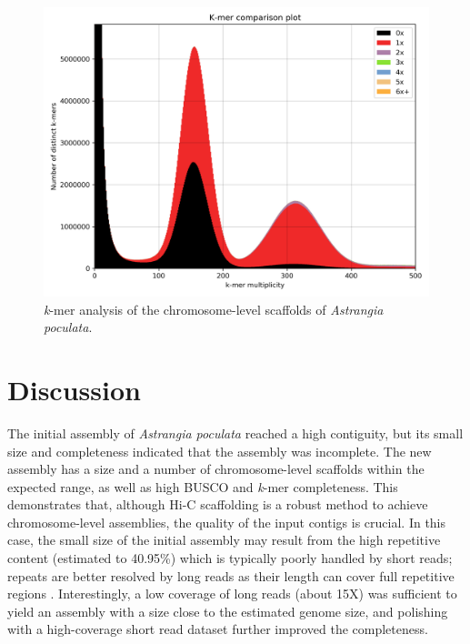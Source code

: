 \begin{figure}[H]
    \centering
    \includegraphics[width=0.9\linewidth]{fig/coral_kat.png}
    \caption{\textit{k}-mer analysis of the chromosome-level scaffolds of \textit{Astrangia poculata}. }
    \label{fig:coral_kat}
\end{figure}

\section{Discussion}

The initial assembly of \textit{Astrangia poculata} reached a high contiguity, but its small size and completeness indicated that the assembly was incomplete. The new assembly has a size and a number of chromosome-level scaffolds within the expected range, as well as high BUSCO and \textit{k}-mer completeness. This demonstrates that, although Hi-C scaffolding is a robust method to achieve chromosome-level assemblies, the quality of the input contigs is crucial. In this case, the small size of the initial assembly may result from the high repetitive content (estimated to 40.95\%) which is typically poorly handled by short reads; repeats are better resolved by long reads as their length can cover full repetitive regions \cite{pollard2018}. Interestingly, a low coverage of long reads (about 15X) was sufficient to yield an assembly with a size close to the estimated genome size, and polishing with a high-coverage short read dataset further improved the completeness. \\

